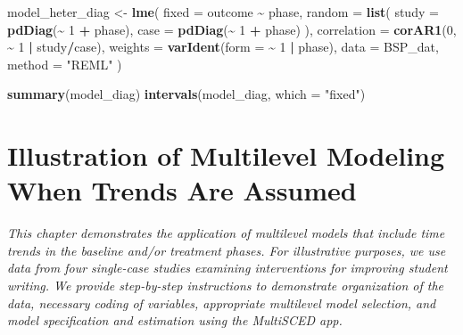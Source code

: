 \documentclass[
]{book}
\newenvironment{Shaded}{\begin{snugshade}}{\end{snugshade}}
\newcommand{\AttributeTok}[1]{\textcolor[rgb]{0.13,0.29,0.53}{#1}}
\newcommand{\DecValTok}[1]{\textcolor[rgb]{0.00,0.00,0.81}{#1}}
\newcommand{\FunctionTok}[1]{\textcolor[rgb]{0.13,0.29,0.53}{\textbf{#1}}}
\newcommand{\NormalTok}[1]{#1}
\newcommand{\OtherTok}[1]{\textcolor[rgb]{0.56,0.35,0.01}{#1}}
\newcommand{\SpecialCharTok}[1]{\textcolor[rgb]{0.81,0.36,0.00}{\textbf{#1}}}
\newcommand{\StringTok}[1]{\textcolor[rgb]{0.31,0.60,0.02}{#1}}
\begin{document}
\begin{Shaded}
\begin{Highlighting}[]
\NormalTok{model\_heter\_diag }\OtherTok{\textless{}{-}} 
  \FunctionTok{lme}\NormalTok{(}
    \AttributeTok{fixed =}\NormalTok{ outcome }\SpecialCharTok{\textasciitilde{}}\NormalTok{ phase, }
    \AttributeTok{random =} \FunctionTok{list}\NormalTok{(}
      \AttributeTok{study =} \FunctionTok{pdDiag}\NormalTok{(}\SpecialCharTok{\textasciitilde{}} \DecValTok{1} \SpecialCharTok{+}\NormalTok{ phase),}
      \AttributeTok{case =} \FunctionTok{pdDiag}\NormalTok{(}\SpecialCharTok{\textasciitilde{}} \DecValTok{1} \SpecialCharTok{+}\NormalTok{ phase)}
\NormalTok{    ),}
    \AttributeTok{correlation =} \FunctionTok{corAR1}\NormalTok{(}\DecValTok{0}\NormalTok{, }\SpecialCharTok{\textasciitilde{}} \DecValTok{1} \SpecialCharTok{|}\NormalTok{ study}\SpecialCharTok{/}\NormalTok{case),}
    \AttributeTok{weights =} \FunctionTok{varIdent}\NormalTok{(}\AttributeTok{form =} \SpecialCharTok{\textasciitilde{}} \DecValTok{1} \SpecialCharTok{|}\NormalTok{ phase),}
    \AttributeTok{data =}\NormalTok{ BSP\_dat,}
    \AttributeTok{method =} \StringTok{"REML"}
\NormalTok{  ) }

\FunctionTok{summary}\NormalTok{(model\_diag)}
\FunctionTok{intervals}\NormalTok{(model\_diag, }\AttributeTok{which =} \StringTok{"fixed"}\NormalTok{)}
\end{Highlighting}
\end{Shaded}

\hypertarget{MLM-Trend}{%
\chapter{Illustration of Multilevel Modeling When Trends Are Assumed}\label{MLM-Trend}}


\emph{This chapter demonstrates the application of multilevel models that include time trends in the baseline and/or treatment phases. For illustrative purposes, we use data from four single-case studies examining interventions for improving student writing. We provide step-by-step instructions to demonstrate organization of the data, necessary coding of variables, appropriate multilevel model selection, and model specification and estimation using the MultiSCED app.}
\end{document}

